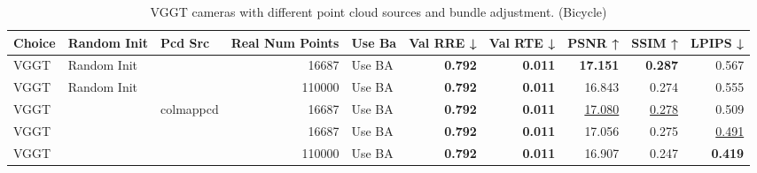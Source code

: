 \begin{table}[H]
\caption{VGGT cameras with different point cloud sources and bundle adjustment. (Bicycle)}
\label{tab:06_isolated_cams_vggt_ba_bicycle}
\begin{tabular}{lllrlrrrrr}
\toprule
Choice & Random Init & Pcd Src & Real Num Points & Use Ba & Val RRE ↓ & Val RTE ↓ & PSNR ↑ & SSIM ↑ & LPIPS ↓ \\
\midrule
VGGT & Random Init &  & 16687 & Use BA & \textbf{0.792} & \textbf{0.011} & \textbf{17.151} & \textbf{0.287} & 0.567 \\
VGGT & Random Init &  & 110000 & Use BA & \textbf{0.792} & \textbf{0.011} & 16.843 & 0.274 & 0.555 \\
VGGT &  & colmappcd & 16687 & Use BA & \textbf{0.792} & \textbf{0.011} & \underline{17.080} & \underline{0.278} & 0.509 \\
VGGT &  &  & 16687 & Use BA & \textbf{0.792} & \textbf{0.011} & 17.056 & 0.275 & \underline{0.491} \\
VGGT &  &  & 110000 & Use BA & \textbf{0.792} & \textbf{0.011} & 16.907 & 0.247 & \textbf{0.419} \\
\bottomrule
\end{tabular}
\end{table}
